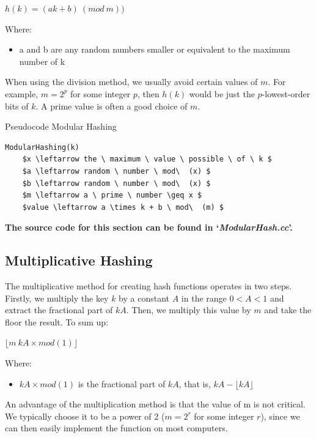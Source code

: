 \documentclass[12pt]{article}
\begin{document}
\begin{center} $h(k) = (ak+b)\  (mod \ m))$ \end{center}

Where: 
\begin{itemize}
\item a and b are any random numbers smaller or equivalent to the maximum number of k 
\end{itemize}

When using the division method, we usually avoid certain values of $m$. For example, $m = 2^p$ for some integer $p$, then $h(k)$ would be just the $p$-lowest-order bits of $k$. A prime value is often a good choice of $m$.

\begin{center}
\begin{large}
Pseudocode Modular Hashing
\end{large}
\end{center}

\begin{lstlisting}[mathescape=true]
ModularHashing(k)
	$x \leftarrow the \ maximum \ value \ possible \ of \ k $
	$a \leftarrow random \ number \ mod\  (x) $
	$b \leftarrow random \ number \ mod\  (x) $
	$m \leftarrow a \ prime \ number \geq x $
	$value \leftarrow a \times k + b \ mod\  (m) $

\end{lstlisting}

\textbf{The source code for this section can be found in `\textit{ModularHash.cc}'.}
\bigskip

\subsection{Multiplicative Hashing}
The multiplicative method for creating hash functions operates in two steps.
Firstly, we multiply the key $k$ by a constant $A$ in the range $0<A<1$ and extract the fractional part of $kA$. Then, we multiply this value by $m$ and take the floor the result. To sum up:  

\begin{center}
 $ \lfloor m\ kA \times mod(1)  \rfloor$
\end{center}
Where:
\begin{itemize}
\item $kA  \times mod(1)$  is the fractional part of $kA$, that is, $kA- \lfloor kA \rfloor$
\end{itemize}
An advantage of the multiplication method is that the value of m is not critical. We typically choose it to be a power of 2 ($m = 2^r$ for some integer $r$), since we can then easily implement the function on most computers.
\end{document}
